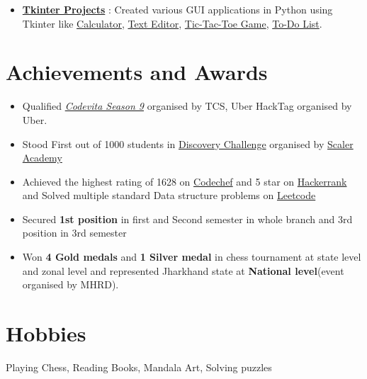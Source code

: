 \documentclass[margin, centered]{res}
\begin{document}
\begin{resume}
\begin{itemize}[leftmargin=*]
 \item \textbf{\href{https://github.com/tannuchoudhary/TkinterProjects}{Tkinter Projects}} : Created various GUI applications in Python using Tkinter like {\href{https://github.com/tannuchoudhary/TkinterProjects/tree/main/Calculator}{Calculator}}, {\href{https://github.com/tannuchoudhary/TkinterProjects/tree/main/Text Editor}{Text Editor}}, {\href{https://github.com/tannuchoudhary/TkinterProjects/tree/main/Tic-Tac-Toe Game}{Tic-Tac-Toe Game}}, {\href{https://github.com/tannuchoudhary/TkinterProjects/tree/main/To-Do list}{To-Do List}}.
 
\end{itemize}




\section{Achievements and Awards}
\begin{itemize}[leftmargin=*]
 \item Qualified  \href{https://drive.google.com/file/d/16OY0sqsJXUs4BXPSdkCaoF_2f4SIdxKI/view?usp=sharing}{\emph{Codevita Season 9}} organised by TCS, Uber HackTag organised by Uber.
 \item Stood First out of 1000 students in  \href{https://drive.google.com/file/d/1IO5cW3NQkcZCm8p65HSRLOaKHfI16ZbS/view?usp=sharing}{Discovery Challenge} organised by \href{https://www.scaler.com/}{Scaler Academy}
 \item Achieved the highest rating of 1628 on \href{https://www.codechef.com/users/tannu_kumari}{Codechef} and 5 star on \href {https://www.hackerrank.com/tannuchoudhary10}{Hackerrank} and Solved multiple standard Data structure problems on \href{https://leetcode.com/tannu_kumari/}{Leetcode}
 \item Secured \textbf{1st position} in first and Second semester in whole branch and 3rd position in 3rd semester
 \item Won \textbf{4 Gold medals} and \textbf{1 Silver medal} in chess tournament at state level and zonal level and represented Jharkhand state at \textbf{National level}(event organised by MHRD).
\end{itemize}



\section{Hobbies}
Playing Chess, Reading Books, Mandala Art, Solving puzzles


\end{resume}
\end{document}
